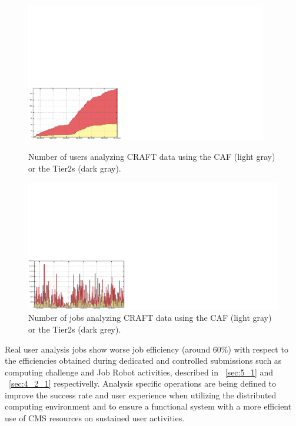 %
\begin{figure}
\begin{minipage}{.48\textwidth}
\centering
\includegraphics[width=0.94\textwidth]{figures/CRAFTusers.pdf}
\caption{Number of users analyzing CRAFT data using the CAF (light gray) or the Tier2s (dark gray).}
\label{fig:CRAFTusers}
\end{minipage}
\begin{minipage}{.48\textwidth}
\centering
\includegraphics[width=1.06\textwidth]{figures/CRAFTjobs.pdf}
\caption{Number of jobs analyzing CRAFT data using the CAF (light gray) or the Tier2s (dark grey).}
\label{fig:CRAFTjobs}
\end{minipage}
\end{figure}


Real user analysis jobs show worse job efficiency (around 60\%) with respect to the efficiencies obtained during dedicated and controlled submissions such 
as computing challenge and Job Robot activities, described in ~\ref{sec:5_1} and ~\ref{sec:4_2_1} respectivelly.
Analysis specific operations are being defined to improve the success rate and user experience when utilizing the distributed computing environment and to ensure a functional system with a more efficient use of CMS resources on sustained user activities.

